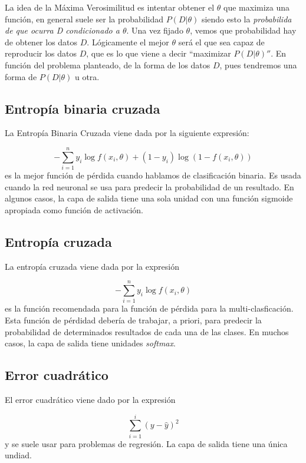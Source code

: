 La idea de la Máxima Verosimilitud es intentar obtener el $\theta$ que maximiza una función, en general suele ser la probabilidad $P(D|\theta)$ siendo esto la \textit{probabilida de que ocurra D condicionado a $\theta$}. Una vez fijado $\theta$, vemos que probabilidad hay de obtener los datos $D$. Lógicamente el mejor $\theta$ será el que sea capaz de reproducir los datos $D$, que es lo que viene a decir ``maximizar $P(D|\theta)''$. En función del problema planteado, de la forma de los datos $D$, pues tendremos una forma de $P(D|\theta)$ u otra. 

\subsection{Entropía binaria cruzada}

La Entropía Binaria Cruzada viene dada por la siguiente expresión: 

\begin{equation}
    - \sum_{i=1}^{n} y_i \log f (x_i,\theta) + (1-y_i) \log (1-f(x_i,\theta))
\end{equation}
es la mejor función de pérdida cuando hablamos de clasificación binaria. Es usada cuando la red neuronal se usa para predecir la probabilidad de un resultado. En algunos casos, la capa de salida tiene una sola unidad con una función sigmoide apropiada como función de activación. 


\subsection{Entropía cruzada}

La entropía cruzada viene dada por la expresión 

\begin{equation}
    - \sum_{i=1}^n y_i \log f(x_i,\theta)
\end{equation}
es la función recomendada para la función de pérdida para la multi-clasficación. Esta función de pérdidad debería de trabajar, a priori, para predecir la probabilidad de determinados resultados de cada una de las clases. En muchos casos, la capa de salida tiene unidades \textit{softmax}.

\subsection{Error cuadrático}

El error cuadrático viene dado por la expresión

\begin{equation}
    \sum_{i=1}^{i} (y-\hat{y})^2
\end{equation}
y se suele usar para problemas de regresión. La capa de salida tiene una única undiad. 

